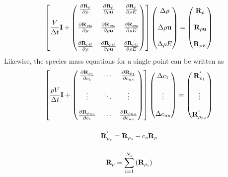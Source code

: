 \begin{equation}
  \left[ 
  \frac{V}{\Delta t}\mathbf I + 
  \begin{pmatrix}
    \frac{\partial \mathbf R_{\rho}}{\partial \rho} & \frac{\partial \mathbf R_{\rho}}{\partial \rho \mathbf u} & \frac{\partial \mathbf R_{\rho}}{\partial \rho E} \\ \\
    \frac{\partial \mathbf R_{\rho \mathbf u}}{\partial \rho} & \frac{\partial \mathbf R_{\rho \mathbf u}}{\partial \rho \mathbf u} & \frac{\partial \mathbf R_{\rho \mathbf u}}{\partial \rho E} \\ \\
    \frac{\partial \mathbf R_{\rho E}}{\partial \rho} & \frac{\partial \mathbf R_{\rho E}}{\partial \rho \mathbf u} & \frac{\partial \mathbf R_{\rho E}}{\partial \rho E}
  \end{pmatrix}
  \right]
  \begin{pmatrix}
    \Delta \rho \\ \\
    \Delta \rho \mathbf u \\ \\
    \Delta \rho E
  \end{pmatrix}
  =
  \begin{pmatrix}
    \mathbf R_{\rho} \\ \\
    \mathbf R_{\rho \mathbf u} \\ \\
    \mathbf R_{\rho E}
  \end{pmatrix}
  \label{approx-jac}
\end{equation}
Likewise, the species mass equations for a single point can be written as
\begin{gather}
  \left[
    \frac{\rho V}{\Delta t}\mathbf I + 
    \begin{pmatrix}
      \frac{\partial \mathbf R_{\rho_1}}{\partial c_1} & \cdots & \frac{\partial \mathbf R_{\rho_{1}}}{\partial c_{ns}} \\ \\
      \vdots & \ddots & \vdots \\ \\
      \frac{\partial \mathbf R_{\rho_{ns}}}{\partial c_1} & \cdots & \frac{\partial \mathbf R_{\rho_{ns}}}{\partial c_{ns}}
    \end{pmatrix}
  \right]
  \begin{pmatrix}
    \Delta c_1 \\ \\
    \vdots \\ \\
    \Delta c_{ns}
  \end{pmatrix}
  =
  \begin{pmatrix}
    \mathbf R_{\rho_1}^{'} \\ \\
    \vdots \\ \\
    \mathbf R_{\rho_{ns}}^{'}
  \end{pmatrix}
  \label{approx-jac-dc} \\[12pt]
  \mathbf R_{\rho_s}^{'} = \mathbf R_{\rho_s} - c_s \mathbf R_{\rho}
  \label{resp-def} \\[12pt]
  \mathbf R_{\rho} = \sum_{i=1}^{N_s}\left(\mathbf R_{\rho_i}\right)
  \label{resrho-def}
\end{gather}
